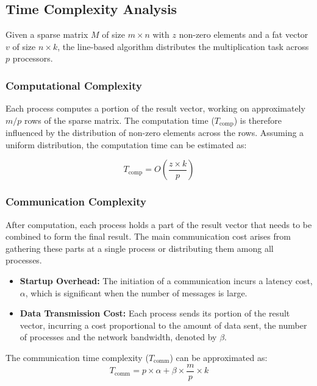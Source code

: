 \documentclass[12pt,oneside]{book} %
\begin{document}
\subsection{Time Complexity Analysis}
Given a sparse matrix $M$ of size $m \times n$ with $z$ non-zero elements and a
fat vector $v$ of size $n \times k$, the line-based algorithm distributes the
multiplication task across $p$ processors.

\subsubsection{Computational Complexity}

Each process computes a portion of the result vector, working on approximately
\(m/p\) rows of the sparse matrix. The computation time (\(T_{\text{comp}}\))
is therefore influenced by the distribution of non-zero elements across the
rows. Assuming a uniform distribution, the computation time can be estimated
as:

\begin{equation}
    T_{\text{comp}} = O\left(\frac{z \times k}{p}\right)
\end{equation}

\subsubsection{Communication Complexity}

After computation, each process holds a part of the result vector that needs to
be combined to form the final result. The main communication cost arises from
gathering these parts at a single process or distributing them among all
processes.

\begin{itemize}
    \item \textbf{Startup Overhead:} The initiation of a communication incurs a latency cost, \(\alpha\), which is significant when the number of messages is large.
    \item \textbf{Data Transmission Cost:} Each process sends its portion of the result vector, incurring a cost proportional to the amount of data sent, the number of processes and the network bandwidth, denoted by \(\beta\).
\end{itemize}

The communication time complexity (\(T_{\text{comm}}\)) can be approximated as:
\begin{equation}
    T_{\text{comm}} = p \times \alpha + \beta \times \frac{m}{p} \times k
\end{equation}
\end{document}
